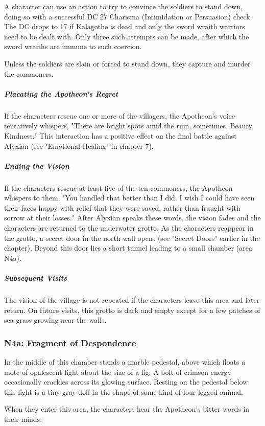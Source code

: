 \documentclass[10pt,a4paper,twoside,bg=print,twocolumn,openany,nodeprecatedcode]{dndbook}
\begin{document}
A character can use an action to try to convince the soldiers to stand down, doing so with a successful DC 27 Charisma (Intimidation or Persuasion) check. The DC drops to 17 if Kalagothe is dead and only the sword wraith warriors need to be dealt with. Only three such attempts can be made, after which the sword wraiths are immune to such coercion.

Unless the soldiers are slain or forced to stand down, they capture and murder the commoners.

\subparagraph{Placating the Apotheon's Regret}
If the characters rescue one or more of the villagers, the Apotheon's voice tentatively whispers, "There are bright spots amid the ruin, sometimes. Beauty. Kindness." This interaction has a positive effect on the final battle against Alyxian (see "Emotional Healing" in chapter 7).

\subparagraph{Ending the Vision}
If the characters rescue at least five of the ten commoners, the Apotheon whispers to them, "You handled that better than I did. I wish I could have seen their faces happy with relief that they were saved, rather than fraught with sorrow at their losses." After Alyxian speaks these words, the vision fades and the characters are returned to the underwater grotto. As the characters reappear in the grotto, a secret door in the north wall opens (see "Secret Doors" earlier in the chapter). Beyond this door lies a short tunnel leading to a small chamber (area N4a).

\subparagraph{Subsequent Visits}
The vision of the village is not repeated if the characters leave this area and later return. On future visits, this grotto is dark and empty except for a few patches of sea grass growing near the walls.

\subsubsection{N4a: Fragment of Despondence}
\begin{DndReadAloud}{}
In the middle of this chamber stands a marble pedestal, above which floats a mote of opalescent light about the size of a fig. A bolt of crimson energy occasionally crackles across its glowing surface. Resting on the pedestal below this light is a tiny gray doll in the shape of some kind of four-legged animal.

\end{DndReadAloud}

When they enter this area, the characters hear the Apotheon's bitter words in their minds:
\end{document}
